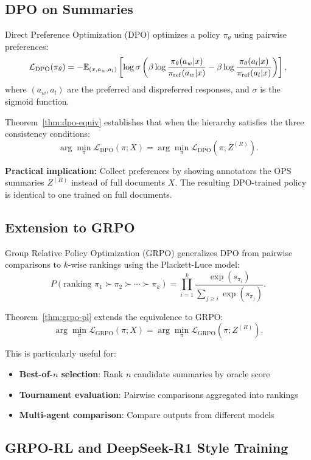 \subsection{DPO on Summaries}

Direct Preference Optimization (DPO) \citep{RafailovEtAl2023DPO} optimizes a policy $\pi_\theta$ using pairwise preferences:
\[
\mathcal{L}_{\mathrm{DPO}}(\pi_\theta) = -\mathbb{E}_{(x, a_w, a_l)} \left[ \log \sigma\left( \beta \log \frac{\pi_\theta(a_w|x)}{\pi_{\mathrm{ref}}(a_w|x)} - \beta \log \frac{\pi_\theta(a_l|x)}{\pi_{\mathrm{ref}}(a_l|x)} \right) \right],
\]
where $(a_w, a_l)$ are the preferred and dispreferred responses, and $\sigma$ is the sigmoid function.

Theorem~\ref{thm:dpo-equiv} establishes that when the hierarchy satisfies the three consistency conditions:
\[
\arg\min_\pi \mathcal{L}_{\mathrm{DPO}}(\pi; X) = \arg\min_\pi \mathcal{L}_{\mathrm{DPO}}(\pi; Z^{(R)}).
\]

\textbf{Practical implication:} Collect preferences by showing annotators the OPS summaries $Z^{(R)}$ instead of full documents $X$. The resulting DPO-trained policy is identical to one trained on full documents.

\subsection{Extension to GRPO}

Group Relative Policy Optimization (GRPO) generalizes DPO from pairwise comparisons to $k$-wise rankings using the Plackett-Luce model:
\[
P(\text{ranking } \pi_1 \succ \pi_2 \succ \cdots \succ \pi_k) = \prod_{i=1}^k \frac{\exp(s_{\pi_i})}{\sum_{j \ge i} \exp(s_{\pi_j})}.
\]

Theorem~\ref{thm:grpo-pl} extends the equivalence to GRPO:
\[
\arg\min_\pi \mathcal{L}_{\mathrm{GRPO}}(\pi; X) = \arg\min_\pi \mathcal{L}_{\mathrm{GRPO}}(\pi; Z^{(R)}).
\]

This is particularly useful for:
\begin{itemize}[nosep]
    \item \textbf{Best-of-$n$ selection}: Rank $n$ candidate summaries by oracle score
    \item \textbf{Tournament evaluation}: Pairwise comparisons aggregated into rankings
    \item \textbf{Multi-agent comparison}: Compare outputs from different models
\end{itemize}

\subsection{GRPO-RL and DeepSeek-R1 Style Training}

